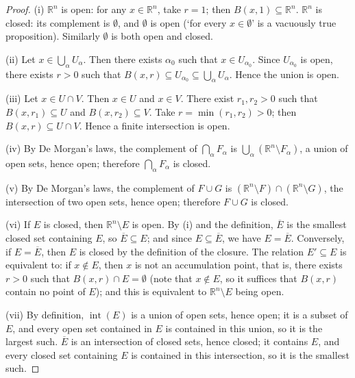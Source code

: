\begin{proof}
(i) $\mathbb{R}^n$ is open: for any $x \in \mathbb{R}^n$, take $r = 1$; then $B(x, 1) \subseteq \mathbb{R}^n$. $\mathbb{R}^n$ is closed: its complement is $\emptyset$, and $\emptyset$ is open (`for every $x \in \emptyset$' is a vacuously true proposition). Similarly $\emptyset$ is both open and closed.

(ii) Let $x \in \bigcup_\alpha U_\alpha$. Then there exists $\alpha_0$ such that $x \in U_{\alpha_0}$. Since $U_{\alpha_0}$ is open, there exists $r > 0$ such that $B(x, r) \subseteq U_{\alpha_0} \subseteq \bigcup_\alpha U_\alpha$. Hence the union is open.

(iii) Let $x \in U \cap V$. Then $x \in U$ and $x \in V$. There exist $r_1, r_2 > 0$ such that $B(x, r_1) \subseteq U$ and $B(x, r_2) \subseteq V$. Take $r = \min(r_1, r_2) > 0$; then $B(x, r) \subseteq U \cap V$. Hence a finite intersection is open.

(iv) By De Morgan's laws, the complement of $\bigcap_\alpha F_\alpha$ is $\bigcup_\alpha (\mathbb{R}^n \setminus F_\alpha)$, a union of open sets, hence open; therefore $\bigcap_\alpha F_\alpha$ is closed.

(v) By De Morgan's laws, the complement of $F \cup G$ is $(\mathbb{R}^n \setminus F) \cap (\mathbb{R}^n \setminus G)$, the intersection of two open sets, hence open; therefore $F \cup G$ is closed.

(vi) If $E$ is closed, then $\mathbb{R}^n \setminus E$ is open. By (i) and the definition, $\overline{E}$ is the smallest closed set containing $E$, so $\overline{E} \subseteq E$; and since $E \subseteq \overline{E}$, we have $E = \overline{E}$. Conversely, if $E = \overline{E}$, then $E$ is closed by the definition of the closure. The relation $E' \subseteq E$ is equivalent to: if $x \notin E$, then $x$ is not an accumulation point, that is, there exists $r > 0$ such that $B(x, r) \cap E = \emptyset$ (note that $x \notin E$, so it suffices that $B(x, r)$ contain no point of $E$); and this is equivalent to $\mathbb{R}^n \setminus E$ being open.

(vii) By definition, $\operatorname{int}(E)$ is a union of open sets, hence open; it is a subset of $E$, and every open set contained in $E$ is contained in this union, so it is the largest such. $\overline{E}$ is an intersection of closed sets, hence closed; it contains $E$, and every closed set containing $E$ is contained in this intersection, so it is the smallest such.


\end{proof}
